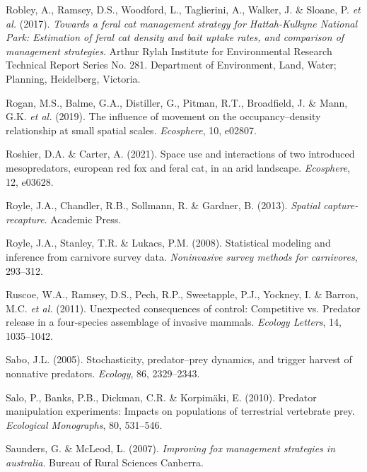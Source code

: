 \documentclass[11pt,a4paper,titlepage,twoside,openright]{style/unimelbthesis}
\begin{document}
\begin{mainmatter}
\leavevmode\hypertarget{ref-robley2017towards}{}%
Robley, A., Ramsey, D.S., Woodford, L., Taglierini, A., Walker, J. \& Sloane, P. \emph{et al.} (2017). \emph{Towards a feral cat management strategy for Hattah-Kulkyne National Park: Estimation of feral cat density and bait uptake rates, and comparison of management strategies}. Arthur Rylah Institute for Environmental Research Technical Report Series No. 281. Department of Environment, Land, Water; Planning, Heidelberg, Victoria.

\leavevmode\hypertarget{ref-rogan2019influence}{}%
Rogan, M.S., Balme, G.A., Distiller, G., Pitman, R.T., Broadfield, J. \& Mann, G.K. \emph{et al.} (2019). The influence of movement on the occupancy--density relationship at small spatial scales. \emph{Ecosphere}, 10, e02807.

\leavevmode\hypertarget{ref-roshier2021space}{}%
Roshier, D.A. \& Carter, A. (2021). Space use and interactions of two introduced mesopredators, european red fox and feral cat, in an arid landscape. \emph{Ecosphere}, 12, e03628.

\leavevmode\hypertarget{ref-royle2013spatial}{}%
Royle, J.A., Chandler, R.B., Sollmann, R. \& Gardner, B. (2013). \emph{Spatial capture-recapture}. Academic Press.

\leavevmode\hypertarget{ref-royle2008statistical}{}%
Royle, J.A., Stanley, T.R. \& Lukacs, P.M. (2008). Statistical modeling and inference from carnivore survey data. \emph{Noninvasive survey methods for carnivores}, 293--312.

\leavevmode\hypertarget{ref-ruscoe2011unexpected}{}%
Ruscoe, W.A., Ramsey, D.S., Pech, R.P., Sweetapple, P.J., Yockney, I. \& Barron, M.C. \emph{et al.} (2011). Unexpected consequences of control: Competitive vs. Predator release in a four-species assemblage of invasive mammals. \emph{Ecology Letters}, 14, 1035--1042.

\leavevmode\hypertarget{ref-sabo2005stochasticity}{}%
Sabo, J.L. (2005). Stochasticity, predator--prey dynamics, and trigger harvest of nonnative predators. \emph{Ecology}, 86, 2329--2343.

\leavevmode\hypertarget{ref-salo2010predator}{}%
Salo, P., Banks, P.B., Dickman, C.R. \& Korpimäki, E. (2010). Predator manipulation experiments: Impacts on populations of terrestrial vertebrate prey. \emph{Ecological Monographs}, 80, 531--546.

\leavevmode\hypertarget{ref-saunders2007improving}{}%
Saunders, G. \& McLeod, L. (2007). \emph{Improving fox management strategies in australia}. Bureau of Rural Sciences Canberra.


\end{mainmatter}
\end{document}
